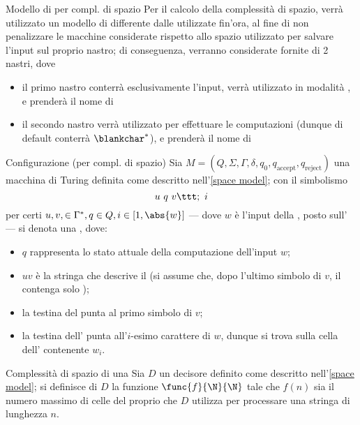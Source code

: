 \documentclass[a4paper, 12pt]{report}
\begin{document}
    \begin{framedobs}[label={space model}]{Modello di \TM per compl. di spazio}
        Per il calcolo della complessità di spazio, verrà utilizzato un modello di \TM differente dalle \TM utilizzate fin'ora, al fine di non penalizzare le macchine considerate rispetto allo spazio utilizzato per salvare l'input sul proprio nastro; di conseguenza, verranno considerate \TM fornite di 2 nastri, dove

        \begin{itemize}
            \item il primo nastro conterrà esclusivamente l'input, verrà utilizzato in modalità , e prenderà il nome di 
            \item il secondo nastro verrà utilizzato per effettuare le computazioni (dunque di default conterrà $\blankchar^*$), e prenderà il nome di 
        \end{itemize}
    \end{framedobs}

    \begin{frameddefn}[breakable]{Configurazione (\TM per compl. di spazio)}
        Sia $M = (Q, \Sigma, \Gamma, \delta, q_0, q_\mathrm{accept}, q_\mathrm{reject})$ una macchina di Turing definita come descritto nell'\cref{space model}; con il simbolismo $$u \ q \ v \ttt ; \ i$$ per certi $u, v, \in \Gamma^*, q \in Q, i \in [1, \abs{w}]$ --- dove $w$ è l'input della \TM, posto sull' --- si denota una , dove:

        \begin{itemize}
            \item $q$ rappresenta lo stato attuale della computazione dell'input $w$;
            \item $uv$ è la stringa che descrive il  (si assume che, dopo l'ultimo simbolo di $v$, il  contenga solo \blankchar);
            \item la testina del  punta al primo simbolo di $v$;
            \item la testina dell' punta all'$i$-esimo carattere di $w$, dunque si trova sulla cella dell' contenente $w_i$.
        \end{itemize}
    \end{frameddefn}

    \begin{frameddefn}[label={space complexity}]{Complessità di spazio di una \TM}
        Sia $D$ un decisore definito come descritto nell'\cref{space model}; si definisce  di $D$ la funzione $\func{f}{\N}{\N}$ tale che $f(n)$ sia il numero massimo di celle del proprio  che $D$ utilizza per processare una stringa di lunghezza $n$.
    \end{frameddefn}
\end{document}

